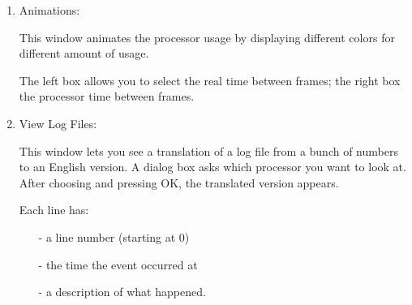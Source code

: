 \begin{enumerate}
\item
Animations:

   This window animates the processor usage by displaying
   different colors for different amount of usage.

   The left box allows you to select the real time between frames;
   the right box the processor time between frames.


\item
View Log Files:

   This window lets you see a translation of a log file from a bunch of numbers
   to an English version.  A dialog box asks which processor you want to look
   at.  After choosing and pressing OK, the translated version appears.

   Each line has:
   \begin{itemize}
   \item[-] a line number (starting at 0)
   \item[-] the time the event occurred at
   \item[-] a description of what happened.
   \end{itemize}

\end{enumerate}
